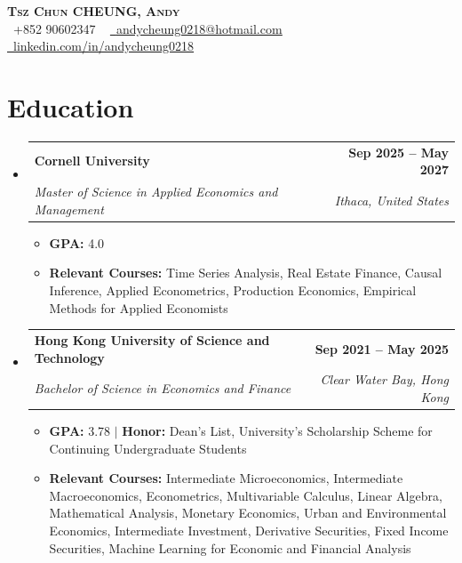 \documentclass[letterpaper,11pt]{article}
\makeatletter
\newcommand{\resumeItem}[1]{
  \item\small{
    {#1 \vspace{-2pt}}
  }
}
\newcommand{\resumeSubheading}[4]{
  \vspace{-2pt}\item
    \begin{tabular*}{1.0\textwidth}[t]{l@{\extracolsep{\fill}}r}
      \textbf{#1} & \textbf{\small #2} \\
      \textit{\small#3} & \textit{\small #4} \\
    \end{tabular*}\vspace{-7pt}
}
\newcommand{\resumeSubHeadingListStart}{\begin{itemize}[leftmargin=0.0in, label={}]}
\newcommand{\resumeSubHeadingListEnd}{\end{itemize}}
\newcommand{\resumeItemListStart}{\begin{itemize}}
\newcommand{\resumeItemListEnd}{\end{itemize}\vspace{-5pt}}
\makeatother
\begin{document}

\begin{center}
    \textbf{\Huge \scshape Tsz Chun CHEUNG, Andy} \\ \vspace{1pt}
    \small \raisebox{-0.1\height}\faPhone\ +852 90602347 ~ \href{mailto:x@gmail.com}{\raisebox{-0.2\height}\faEnvelope\  \underline{andycheung0218@hotmail.com}} ~ 
    \href{https://linkedin.com/in//}{\raisebox{-0.2\height}\faLinkedin\ \underline{linkedin.com/in/andycheung0218}}  ~
    \vspace{-16pt}
\end{center}


\section{Education}
    \resumeSubHeadingListStart
        \resumeSubheading
            {Cornell University}{Sep 2025 -- May 2027}
            {Master of Science in Applied Economics and Management}{Ithaca, United States}
            \resumeItemListStart
                \resumeItem{\textbf{GPA:} 4.0}
                \resumeItem{\textbf{Relevant Courses:} Time Series Analysis, Real Estate Finance, Causal Inference, Applied Econometrics, Production Economics, Empirical Methods for Applied Economists}
            \resumeItemListEnd
        \vspace{-3pt}
        \resumeSubheading
            {Hong Kong University of Science and Technology}{Sep 2021 -- May 2025}
            {Bachelor of Science in Economics and Finance}{Clear Water Bay, Hong Kong}
            \resumeItemListStart
                \resumeItem{\textbf{GPA:} 3.78 $|$ \textbf{Honor:} Dean’s List, University's Scholarship Scheme for Continuing Undergraduate Students}
                \resumeItem{\textbf{Relevant Courses:} Intermediate Microeconomics, Intermediate Macroeconomics, Econometrics, Multivariable Calculus, Linear Algebra, Mathematical Analysis, Monetary Economics, Urban and Environmental Economics, Intermediate Investment, Derivative Securities, Fixed Income Securities, Machine Learning for Economic and Financial Analysis}
            \resumeItemListEnd
    \resumeSubHeadingListEnd
\vspace{-16pt}
\end{document}
